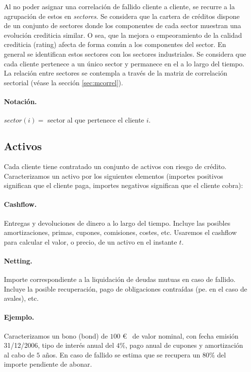 Al no poder asignar una correlaci\'on de fallido cliente a cliente, se recurre
a la agrupaci\'on de estos en \emph{sectores}. Se considera que
la cartera de cr\'editos dispone de un conjunto de sectores donde los componentes
de cada sector muestran una evoluci\'on crediticia similar. O sea, que la mejora
o empeoramiento de la calidad crediticia (rating) afecta de forma com\'un a los
componentes del sector. En general se identifican estos sectores con los 
sectores industriales. 
\newline
\newline
Se considera que cada cliente pertenece a un \'unico sector y permanece en 
el a lo largo del tiempo. La relaci\'on entre sectores se contempla a trav\'es 
de la matriz de correlaci\'on sectorial (v\'ease la secci\'on \ref{sec:mcorrel}).

\paragraph{Notaci\'on.} $sector(i) =$ sector al que pertenece el cliente $i$.

\subsection{Activos}

Cada cliente tiene contratado un conjunto de activos con riesgo de cr\'edito.
Caracterizamos un activo por los siguientes elementos (importes positivos
significan que el cliente paga, importes negativos significan que el cliente 
cobra):

\paragraph{Cashflow.}  Entregas y devoluciones de dinero a lo largo
del tiempo. Incluye las posibles amortizaciones, primas, cupones, comisiones, costes,
etc. Usaremos el cashflow para calcular el valor, o precio, de un activo en el
instante $t$.

\paragraph{Netting.}  Importe correspondiente a la liquidaci\'on de
deudas mutuas en caso de fallido. Incluye la posible recuperaci\'on, pago de
obligaciones contra\'idas (pe. en el caso de avales), etc.

\paragraph{Ejemplo.}
Caracterizamos un bono (bond) de $100$ \euro~ de valor nominal, con fecha emisi\'on
31/12/2006, tipo de inter\'es anual del $4\%$, pago anual de cupones y amortizaci\'on
al cabo de $5$ a\~nos. En caso de fallido se estima que se recupera un $80\%$ del
importe pendiente de abonar.\newline

